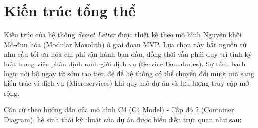 \section{Kiến trúc tổng thể}

Kiến trúc của hệ thống \textit{Secret Letter} được thiết kế theo mô hình Nguyên khối Mô-đun hóa (Modular Monolith) ở giai đoạn MVP. Lựa chọn này bắt nguồn từ nhu cầu tối ưu hóa chi phí vận hành ban đầu, đồng thời vẫn phải duy trì tính kỷ luật trong việc phân định ranh giới dịch vụ (Service Boundaries). Sự tách bạch logic nội bộ ngay từ sớm tạo tiền đề để hệ thống có thể chuyển đổi mượt mà sang kiến trúc vi dịch vụ (Microservices) khi quy mô dự án và lưu lượng truy cập mở rộng.

Căn cứ theo hướng dẫn của mô hình C4 (C4 Model) - Cấp độ 2 (Container Diagram), hệ sinh thái kỹ thuật của dự án được biểu diễn trực quan như sau:

